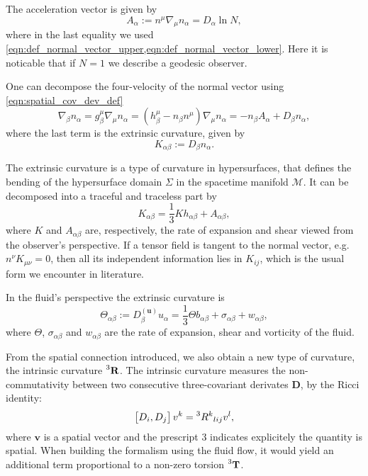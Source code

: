 The acceleration vector is given by
\begin{equation}
    A_\alpha:=n^\mu \nabla_\mu n_\alpha=D_\alpha\ln N,
\end{equation}
where in the last equality we used \cref{eqn:def_normal_vector_upper,eqn:def_normal_vector_lower}. 
Here it is noticable that if $N=1$ we describe a geodesic observer.

One can decompose the four-velocity of the normal vector using \cref{eqn:spatial_cov_dev_def}
\begin{equation}
    \nabla_\beta n_\alpha = g_\beta^\mu \nabla_\mu n_\alpha = (h_\beta^\mu-n_\beta n^\mu)\nabla_\mu n_\alpha=-n_\beta A_\alpha + D_\beta n_\alpha,
\end{equation}
where the last term is the extrinsic curvature, given by
\begin{equation}
    K_{\alpha\beta}:=D_\beta n_\alpha. 
\end{equation}

The extrinsic curvature is a type of curvature in hypersurfaces, that defines the bending of the hypersurface domain $\Sigma$ in the spacetime manifold $\mathcal{M}$.
It can be decomposed into a traceful and traceless part by
\begin{equation}
    K_{\alpha\beta}=\frac{1}{3}Kh_{\alpha\beta}+A_{\alpha\beta},
\end{equation}
where $K$ and $A_{\alpha\beta}$ are, respectively, the rate of expansion and shear viewed from the observer's perspective.
If a tensor field is tangent to the normal vector, e.g. $n^\nu K_{\mu\nu}=0$, then all its independent information lies in $K_{ij}$, which is the usual form we encounter in literature.


In the fluid's perspective the extrinsic curvature is
\begin{equation}
    \Theta_{\alpha\beta}:=D^{(\mathbf{u})}_\beta u_\alpha=\frac{1}{3}\Theta b_{\alpha\beta} + \sigma_{\alpha\beta} + w_{\alpha\beta},
\end{equation}
where $\Theta$, $\sigma_{\alpha\beta}$ and $w_{\alpha\beta}$ are the rate of expansion, shear and vorticity of the fluid.

From the spatial connection introduced, we also obtain a new type of curvature, the intrinsic curvature $\prescript{3}{}{\mathbf{R}}$.
The intrinsic curvature measures the non-commutativity between two consecutive three-covariant derivates $\mathbf{D}$, by the Ricci identity:
\begin{equation}
    \left[D_i,D_j\right]v^k=\prescript{3}{}R^{k}{}_{lij}v^l,
    \label{eqn:spatial_ricci_identity}
\end{equation}
where $\mathbf{v}$ is a spatial vector and the prescript 3 indicates explicitely the quantity is spatial. 
When building the formalism using the fluid flow, it would yield an additional term proportional to a non-zero torsion $\prescript{3}{}{\mathbf{T}}$.%


